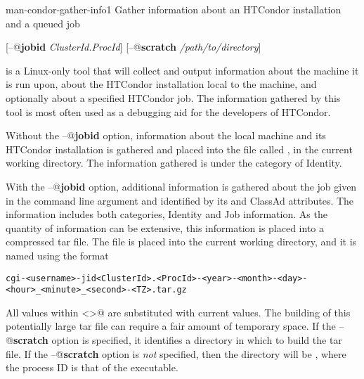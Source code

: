 \begin{ManPage}{}{man-condor-gather-info}{1}
{Gather information about an HTCondor installation and a queued job}

\Synopsis

[\verb@--@\textbf{jobid} \textit{ClusterId.ProcId}]
[\verb@--@\textbf{scratch} \textit{/path/to/directory}]

\Description

 is a Linux-only tool that
will collect and output information 
about the machine it is run upon,
about the HTCondor installation local to the machine, 
and optionally about a specified HTCondor job. 
The information gathered by this tool is most often used as a debugging aid
for the developers of HTCondor.

Without the \verb@--@\textbf{jobid} option, information about the
local machine and its HTCondor installation is gathered and
placed into the file called ,
in the current working directory. 
The information gathered is under the category of Identity.

With the \verb@--@\textbf{jobid} option, 
additional information is gathered about the job given
in the command line argument and identified by
its  and  ClassAd attributes.
The information includes both categories, 
Identity and Job information.
As the quantity of information can be extensive,
this information is placed into a compressed tar file.
The file is placed into the current working directory,
and it is named using the format
\footnotesize
\begin{verbatim}
cgi-<username>-jid<ClusterId>.<ProcId>-<year>-<month>-<day>-<hour>_<minute>_<second>-<TZ>.tar.gz
\end{verbatim}
\normalsize
All values within \verb@<>@ are substituted with current values.
The building of this potentially large tar file can require a fair
amount of temporary space.
If the \verb@--@\textbf{scratch} option is specified,
it identifies a directory in which to build the tar file.
If the \verb@--@\textbf{scratch} option is \emph{not} specified, 
then the directory will be ,
where the process ID is that of the  executable.


\end{ManPage}
